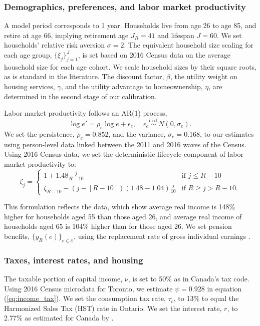 \documentclass[parskip=full]{article}
\begin{document}
\subsubsection{Demographics, preferences, and labor market productivity}
A model period corresponds to 1 year. Households live from age 26 to age 85, and retire at age 66, implying retirement age $J_{R}=41$ and lifespan $J=60$. We set households' relative risk aversion $\sigma=2$. The equivalent household size scaling for each age group, $\{\xi_{j}\}_{j=1}^{J}$, is set based on 2016 Census data on the average household size for each age cohort. We scale household sizes by their square roots, as is standard in the literature. The discount factor, $\beta$, the utility weight on housing services, $\gamma$, and the utility advantage to homeownership, $\eta$, are determined in the second stage of our calibration.

Labor market productivity follows an AR(1) process,
\begin{equation*}
  \log e' = \rho_{e} \log e + \epsilon_{e},\quad \epsilon_{e}\overset{\mathrm{i.i.d.}}\sim N(0,\sigma_{e}).
\end{equation*}
We set the persistence, $\rho_{e}=0.852$, and the variance, $\sigma_{e}=0.168$, to our estimates using person-level data linked between the 2011 and 2016 waves of the Census. Using 2016 Census data, we set the deterministic lifecycle component of labor market productivity to: 
\begin{equation*}
\zeta_j = \begin{cases}
1+1.48 \frac{j}{R-10} &\text{if $j\leq R-10$}\\
\zeta_{R-10}-\left(j-\left[R-10\right]\right) (1.48-1.04) \frac{j}{10} &\text{if $R \geq j>R-10$}.
\end{cases}
\end{equation*}

\noindent This formulation reflects the data, which show average real income is 148\% higher for households aged 55 than those aged 26, and average real income of households aged 65 is 104\% higher than for those aged 26. We set pension benefits, $\{y_{R}(e)\}_{e\in \mathcal{E}}$, using the replacement rate of gross individual earnings \citep{OECD-pension}.

\subsubsection{Taxes, interest rates, and housing}

The taxable portion of capital income, $\nu$, is set to 50\% as in Canada's tax code. Using 2016 Census microdata for Toronto, we estimate $\psi=0.928$ in equation (\ref{eq:income_tax}). We set the consumption tax rate, $\tau_{c}$, to 13\% to equal the Harmonized Sales Tax (HST) rate in Ontario. We set the interest rate, $r$, to 2.77\% as estimated for Canada by \citet{bruneau-etal-2018}. 
\end{document}
